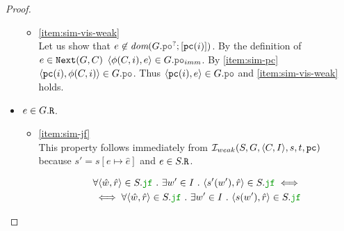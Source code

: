 \documentclass[12pt]{article}
\begin{document}
\begin{proof}
\begin{itemize}
\begin{itemize}
    \item \ref{item:sim-vis-weak} \\
      Let us show that $e \not\in \dom{G.\lPO^?;[\lPC(i)]}$.
      By the definition of $e \in {\mathtt{Next}}(G, C)$ $\tup{\front(C, i), e} \in G.\lPO_{imm}$.
      By \ref{item:sim-pc} $\tup{\lPC(i), \front(C, i)} \in G.\lPO$.
      Thus $\tup{\lPC(i), e} \in G.\lPO$ and \ref{item:sim-vis-weak} holds.

    \end{itemize}

  \item $e \in G.{\mathtt{R}}$.
    \begin{itemize}

    \item \ref{item:sim-jf} \\
      This property follows immediately from $\mathcal{I}_{weak}(S, G, \langle C, I \rangle, s, t, {\mathtt{pc}})$
      because $s' = s[e \mapsto \hat{e}]$ and $e \in S.{\mathtt{R}}$.

      \begin{equation*}
        \begin{split}
          & \forall{\tup{\hat{w}, \hat{r}} \in S.\lJF} ~.~
            \exists{w' \in I} ~.~ \tup{s'(w'), \hat{r}} \in S.\lJF \iff \\
          & \iff \forall{\tup{\hat{w}, \hat{r}} \in S.\lJF} ~.~
            \exists{w' \in I} ~.~ \tup{s(w'), \hat{r}} \in S.\lJF
        \end{split}
      \end{equation*}

    \end{itemize}  
    
  \end{itemize}
  
  
      

\end{proof}
\end{document}
